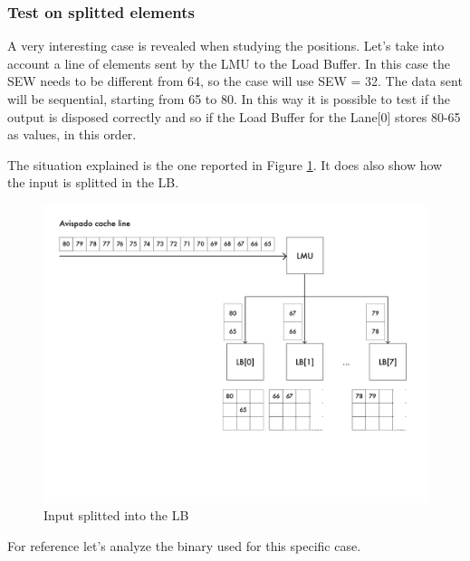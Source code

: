 \subsubsection{Test on splitted elements} 
A very interesting case is revealed when studying the positions.
Let's take into account a line of elements sent by the LMU to the Load Buffer. In this case the SEW needs to be different from 64, so the case will use SEW = 32.
The data sent will be sequential, starting from 65 to 80. In this way it is possible to test if the output is disposed correctly and so if the Load Buffer for the Lane[0] stores 80-65 as values, in this order.

The situation explained is the one reported in Figure \ref{cache-to-lb-split-ex}. It does also show how the input is splitted in the LB.

\begin{figure}[H]
    \centering
    \includegraphics[scale = 0.65]{Chapter_2/img/cache-to-lb-split-ex.png}
    \caption{Input splitted into the LB}
    \label{cache-to-lb-split-ex}
\end{figure}

For reference let's analyze the binary used for this specific case.
\newpage

